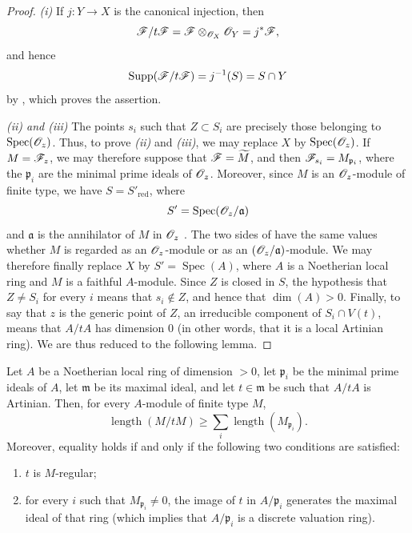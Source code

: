 \begin{proof}
\emph{(i)} If $j:Y\to X$ is the canonical injection, then
\[
\mathscr{F}/t\mathscr{F}
  =\mathscr{F}\otimes_{\mathscr{O}_X}\mathscr{O}_Y
  =j^*\mathscr{F},
\]
and hence
\[
\operatorname{Supp}(\mathscr{F}/t\mathscr{F})
  =j^{-1}(S)=S\cap Y
\]
by , which proves the assertion.

\emph{(ii) and (iii)} The points $s_i$ such that $Z\subset S_i$ are precisely those belonging to $\operatorname{Spec}(\mathscr{O}_z)$.
Thus, to prove \emph{(ii)} and \emph{(iii)}, we may replace $X$ by $\operatorname{Spec}(\mathscr{O}_z)$.
If $M=\mathscr{F}_z$, we may therefore suppose that $\mathscr{F}=\widetilde{M}$, and then $\mathscr{F}_{s_i}=M_{\mathfrak p_i}$, where the $\mathfrak p_i$ are the minimal prime ideals of $\mathscr{O}_z$.
Moreover, since $M$ is an $\mathscr{O}_z$-module of finite type, we have $S=S'_{\mathrm{red}}$, where
\[
S'=\operatorname{Spec}(\mathscr{O}_z/\mathfrak a)
\]
and $\mathfrak a$ is the annihilator of $M$ in $\mathscr{O}_z$ .
The two sides of  have the same values whether $M$ is regarded as an $\mathscr{O}_z$-module or as an $(\mathscr{O}_z/\mathfrak a)$-module.
We may therefore finally replace $X$ by $S'=\operatorname{Spec}(A)$, where $A$ is a Noetherian local ring and $M$ is a faithful $A$-module.
Since $Z$ is closed in $S$, the hypothesis that $Z\neq S_i$ for every $i$ means that $s_i\notin Z$, and hence that $\dim(A)>0$.
Finally, to say that $z$ is the generic point of $Z$, an irreducible component of $S_i\cap V(t)$, means that $A/tA$ has dimension $0$ (in other words, that it is a local Artinian ring).
We are thus reduced to the following lemma.
\end{proof}

\begin{lemma}[3.4.1.2]
\label{IV.3.4.1.2}
Let $A$ be a Noetherian local ring of dimension $>0$, let $\mathfrak p_i$ be the minimal prime ideals of $A$, let $\mathfrak m$ be its maximal ideal, and let $t\in\mathfrak m$ be such that $A/tA$ is Artinian.
Then, for every $A$-module of finite type $M$,
\[
\label{IV.3.4.1.3}
\operatorname{length}(M/tM)
  \geqslant
  \sum_i\operatorname{length}(M_{\mathfrak p_i}).
\tag{3.4.1.3}
\]
Moreover, equality holds if and only if the following two conditions are satisfied:
\begin{enumerate}
  \item[\emph{$\alpha$)}] $t$ is $M$-regular;
  \item[\emph{$\beta$)}] for every $i$ such that $M_{\mathfrak p_i}\neq 0$, the image of $t$ in $A/\mathfrak p_i$ generates the maximal ideal of that ring (which implies that $A/\mathfrak p_i$ is a discrete valuation ring).
\end{enumerate}
\end{lemma}

